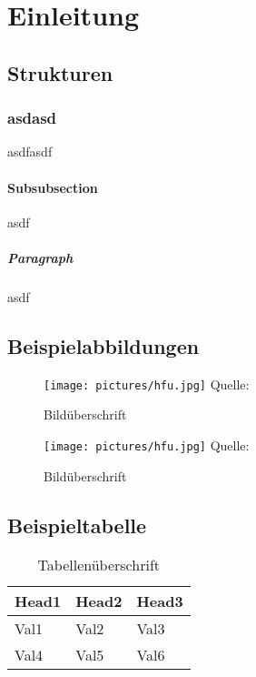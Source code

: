 \chapter{Einleitung}

\section{Strukturen}

\subsection{asdasd}
asdfasdf

\subsubsection{Subsubsection}
asdf

\paragraph{Paragraph}
asdf

\section{Beispielabbildungen}

\lipsum[10]

\begin{wrapfigure}{rt}{0.3\textwidth}
\caption{Bildüberschrift}
\centering
\texttt{[image: pictures/hfu.jpg]}
Quelle: \cite{ParquetStats}
\label{pic:bild2}
\end{wrapfigure}

\lipsum[10]

\begin{figure}
\caption{Bildüberschrift}
\texttt{[image: pictures/hfu.jpg]}
Quelle: \cite{ParquetStats}
\label{pic:bild1}
\end{figure}

\section{Beispieltabelle}

\begin{table}
\caption{Tabellenüberschrift}
\center
\footnotesize
\begin{tabular}{lll}
\toprule
Head1 & Head2 & Head3 \\
\midrule
Val1 & Val2 & Val3 \\
Val4 & Val5 & Val6 \\
\bottomrule
\end{tabular}
\end{table}

